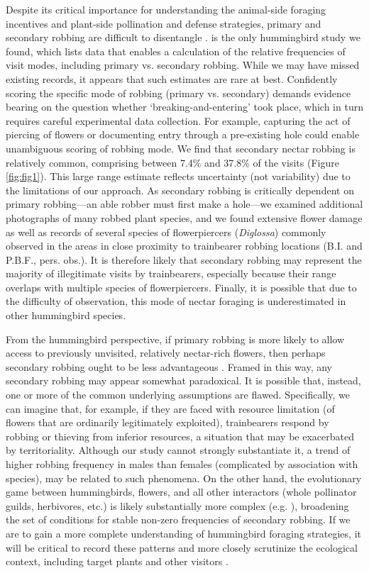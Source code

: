 \documentclass[fleqn,10pt,lineno]{wlpeerj}
\begin{document}
Despite its critical importance for understanding the animal-side foraging incentives and plant-side pollination and defense strategies,
primary and secondary robbing are difficult to disentangle \citep{vogt2006,boehm2018}. 
\citet{snow1980} is the only hummingbird study we found, which lists data that enables a calculation of the relative frequencies of visit modes, including primary vs. secondary robbing. 
While we may have missed existing records, it appears that such estimates are rare at best.
Confidently scoring the specific mode of robbing (primary vs. secondary) demands evidence bearing on the question whether `breaking-and-entering' took place, which in turn requires careful experimental data collection.
For example, capturing the act of piercing of flowers or documenting entry through a pre-existing hole could enable unambiguous scoring of robbing mode.
We find that secondary nectar robbing is relatively common, comprising between 7.4\% and 37.8\% of the visits (Figure \ref{fig:fig1}).
This large range estimate reflects uncertainty (not variability) due to the limitations of our approach.
As secondary robbing is critically dependent on primary robbing---an able robber must first make a hole---we examined additional photographs of many robbed plant species, and we found extensive flower damage as well as records of several species of flowerpiercers (\textit{Diglossa}) commonly observed in the areas in close proximity to trainbearer robbing locations (B.I. and P.B.F., pers. obs.).
It is therefore likely that secondary robbing may represent the majority of illegitimate visits by trainbearers, especially because their range overlaps with multiple species of flowerpiercers. 
Finally, it is possible that due to the difficulty of observation, this mode of nectar foraging is underestimated in other hummingbird species. 

%
%
From the hummingbird perspective, if primary robbing is more likely to allow access to previously unvisited, relatively nectar-rich flowers, then perhaps secondary robbing ought to be less advantageous \citep{irwin2010}.  
Framed in this way, any secondary robbing may appear somewhat paradoxical. 
It is possible that, instead, one or more of the common underlying assumptions are flawed. 
Specifically, we can imagine that, for example, if they are faced with resource limitation (of flowers that are ordinarily legitimately exploited), trainbearers respond by robbing or thieving from inferior resources, a situation that may be exacerbated by territoriality. 
Although our study cannot strongly substantiate it, a trend of higher robbing frequency in males than females (complicated by association with species), may be related to such phenomena.
On the other hand, the evolutionary game between hummingbirds, flowers, and all other interactors (whole pollinator guilds, herbivores, etc.) is likely substantially more complex (e.g. \citealt{maloof2000}), broadening the set of conditions for stable non-zero frequencies of secondary robbing.
If we are to gain a more complete understanding of hummingbird foraging strategies, it will be critical to record these patterns and more closely scrutinize the ecological context, including target plants and other visitors \citep{richman2017}.
\end{document}
